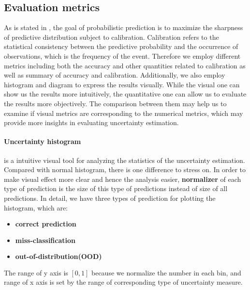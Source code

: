 \subsection{Evaluation metrics}
As is stated in \cite{gneiting2007probabilistic}, the goal of probabilistic prediction is to maximize the sharpness of predictive distribution subject to calibration. Calibration refers to the statistical consistency between the predictive probability and the occurrence of observations, which is the frequency of the event. Therefore we employ different metrics including both the accuracy and other quantities related to calibration as well as summary of accuracy and calibration. Additionally, we also employ histogram and diagram to express the results visually. While the visual one can show us the results more intuitively, the quantitative one can allow us to evaluate the results more objectively. The comparison between them may help us to examine if visual metrics are corresponding to the numerical metrics, which may provide more insights in evaluating uncertainty estimation. 

\paragraph{Uncertainty histogram} is a intuitive visual tool for analyzing the statistics of the uncertainty estimation. Compared with normal histogram, there is one difference to stress on. In order to make visual effect more clear and hence the analysis easier, \textbf{normalizer} of each type of prediction is the size of this type of predictions instead of size of all predictions. In detail, we have three types of prediction for plotting the histogram, which are:
 \begin{itemize}
 	\item \textbf{correct prediction}
 	\item \textbf{miss-classification}
 	\item \textbf{out-of-distribution(OOD)}
 \end{itemize}The range of y axis is $[0,1]$ because we normalize the number in each bin, and range of x axis is set by the range of corresponding type of uncertainty measure.

